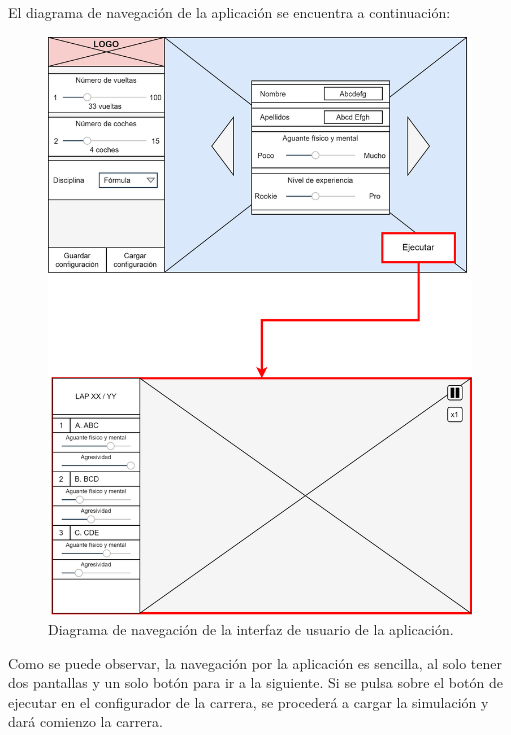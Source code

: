 \bigskip

El diagrama de navegación de la aplicación se encuentra a continuación:

\begin{figure}[H]
    \centering
    \includegraphics[width=\textwidth]{imagenes/nav.png}
    \caption{Diagrama de navegación de la interfaz de usuario de la aplicación.}
 \end{figure}

 Como se puede observar, la navegación por la aplicación es sencilla, al solo tener dos pantallas y un solo botón para ir a la siguiente. Si se pulsa sobre el botón de ejecutar en el configurador de la carrera, se procederá a cargar la simulación y dará comienzo la carrera.